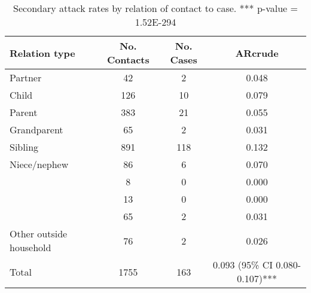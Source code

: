       
\begin{table}[!hb]
    \caption{Secondary attack rates by relation of contact to case. *** p-value = 1.52E-294}
    \begin{tabular}{@{}lccc@{}}
    \toprule
    Relation type & No. Contacts & No. Cases & ARcrude \\
    \cmidrule
    Partner & 42 & 2 & 0.048 \\ 
    Child & 126 & 10 & 0.079 \\                  
    Parent & 383 & 21 & 0.055 \\
    Grandparent & 65       & 2     & 0.031 \\
    Sibling & 891      & 118   & 0.132 \\
    Niece/nephew & 86       & 6     & 0.070 \\
    ~   & 8        & 0     & 0.000 \\
    ~   & 13       & 0     & 0.000  \\
    ~   & 65       & 2     & 0.031  \\
    Other outside household & 76 & 2 & 0.026 \\
    Total & 1755 & 163 & 0.093 (95\% CI 0.080-0.107)*** \\
    \bottomrule
    \end{tabular}
    \label{table2}
\end{table}

